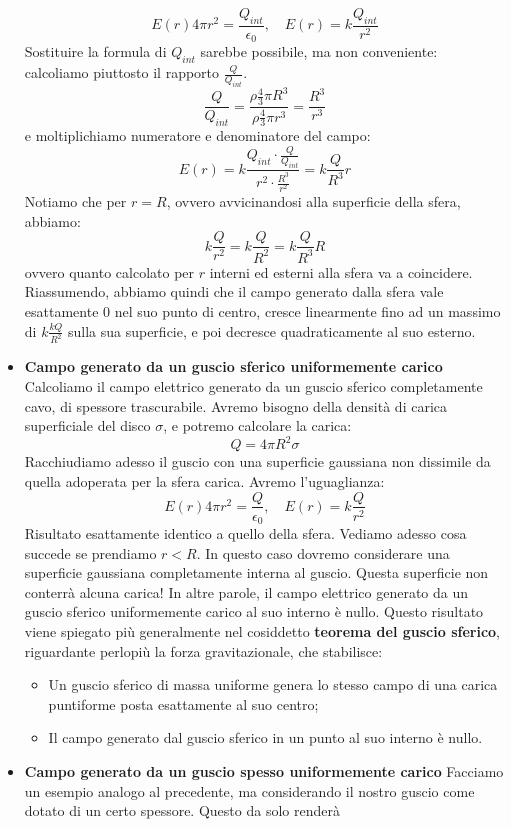 \documentclass[a4paper,12pt]{article}
\begin{document}
\begin{itemize}
$$ E(r)4\pi r^2 = \frac{Q_{int}}{\epsilon_0}, \quad E(r) = k \frac{Q_{int}}{r^2} $$
Sostituire la formula di $Q_{int}$ sarebbe possibile, ma non conveniente: calcoliamo piuttosto il rapporto $\frac{Q}{Q_{int}}$.
$$ \frac{Q}{Q_{int}} = \frac{\rho \frac{4}{3} \pi R^3}{\rho \frac{4}{3} \pi r^3} = \frac{R^3}{r^3} $$
e moltiplichiamo numeratore e denominatore del campo:
$$ E(r) = k \frac{Q_{int} \cdot \frac{Q}{Q_{int}}}{r^2 \cdot \frac{R^3}{r^2}} = k \frac{Q}{R^3}r $$
Notiamo che per $r = R$, ovvero avvicinandosi alla superficie della sfera, abbiamo:
$$ k \frac{Q}{r^2} = k \frac{Q}{R^2} = k \frac{Q}{R^3}R $$
ovvero quanto calcolato per $r$ interni ed esterni alla sfera va a coincidere. Riassumendo, abbiamo quindi
che il campo generato dalla sfera vale esattamente 0 nel suo punto di centro, cresce linearmente fino ad un massimo
di $k\frac{kQ}{R^2}$ sulla sua superficie, e poi decresce quadraticamente al suo esterno.
\item \textbf{Campo generato da un guscio sferico uniformemente carico}
Calcoliamo il campo elettrico generato da un guscio sferico completamente cavo, di spessore trascurabile. Avremo bisogno
della densità di carica superficiale del disco $\sigma$, e potremo calcolare la carica:
$$ Q = 4\pi R^2 \sigma $$
Racchiudiamo adesso il guscio con una superficie gaussiana non dissimile da quella adoperata per la sfera carica. Avremo l'uguaglianza:
$$ E(r)4\pi r^2 = \frac{Q}{\epsilon_0}, \quad E(r) = k\frac{Q}{r^2} $$
Risultato esattamente identico a quello della sfera. Vediamo adesso cosa succede se prendiamo $r < R$. In questo caso dovremo considerare
una superficie gaussiana completamente interna al guscio. Questa superficie non conterrà alcuna carica! In altre parole, il campo elettrico
generato da un guscio sferico uniformemente carico al suo interno è nullo. Questo risultato viene spiegato più generalmente nel cosiddetto
\textbf{teorema del guscio sferico}, riguardante perlopiù la forza gravitazionale, che stabilisce:
\begin{itemize}
  \item Un guscio sferico di massa uniforme genera lo stesso campo di una carica puntiforme posta esattamente al suo centro;
  \item Il campo generato dal guscio sferico in un punto al suo interno è nullo.
\end{itemize}
\item \textbf{Campo generato da un guscio spesso uniformemente carico}
Facciamo un esempio analogo al precedente, ma considerando il nostro guscio come dotato di un certo spessore. Questo da solo renderà

\end{itemize}
\end{document}
